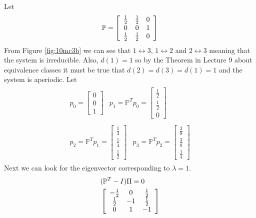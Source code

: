 \begin{example}
Let
$$\mathbb{P} = \left[\begin{array}{c c c} \frac{1}{2} & \frac{1}{2} & 0 \\ 0 & 0 & 1 \\ \frac{1}{2} & \frac{1}{2} & 0 \end{array}\right]$$
From Figure \ref{fig:10mc3b} we can see that $1\leftrightarrow 3$, $1\leftrightarrow 2$ and $2\leftrightarrow 3$ meaning that the system is irreducible. Also, $d(1)=1$ so by the Theorem in Lecture 9 about equivalence classes it must be true that $d(2)=d(3)=d(1)=1$ and the system is aperiodic. Let
\begin{align*}
\begin{split}
p_0 = \left[\begin{array}{c} 0 \\ 0 \\ 1 \end{array}\right]
\end{split}
\begin{split}
p_1 = \mathbb{P}^Tp_0 = \left[\begin{array}{c} \frac{1}{2} \\ \frac{1}{2} \\ 0 \end{array}\right]
\end{split} \\
\begin{split}
p_2 = \mathbb{P}^Tp_1 = \left[\begin{array}{c} \frac{1}{4} \\ \frac{1}{4} \\ \frac{1}{2} \end{array}\right]
\end{split}
\begin{split}
p_3 = \mathbb{P}^Tp_2 = \left[\begin{array}{c} \frac{3}{8} \\ \frac{3}{8} \\ \frac{1}{4} \end{array}\right]
\end{split}
\end{align*}
Next we can look for the eigenvector corresponding to $\lambda=1$.
\begin{align*}
&(\mathbb{P}^T-I)\Pi = 0 \\
&\left[\begin{array}{c c c} -\frac{1}{2} & 0 & \frac{1}{2} \\ \frac{1}{2} & -1 & \frac{1}{2} \\ 0 & 1 & -1 \end{array}\right]

\end{align*}
\end{example}
